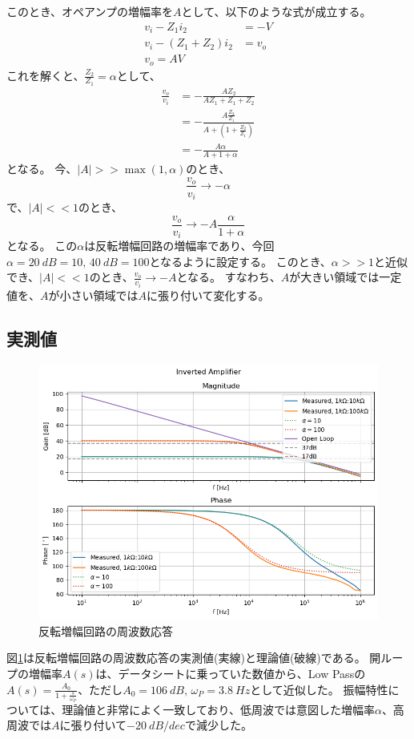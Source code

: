 \documentclass[a4paper]{ltjsarticle}
\begin{document}
このとき、オペアンプの増幅率を$A$として、以下のような式が成立する。
\begin{align}
    v_i - Z_1i_2 &= -V \\
    v_i - (Z_1+Z_2)i_2 &= v_o \\
    v_o = AV
\end{align}
これを解くと、$\frac{Z_2}{Z_1}=\alpha$として、
\begin{align}
    \frac{v_o}{v_i} &= -\frac{AZ_2}{AZ_1+Z_1+Z_2} \nonumber \\
    &= -\frac{A\frac{Z_2}{Z_1}}{A+\left( 1+\frac{Z_2}{Z_1} \right)} \nonumber \\
    &= -\frac{A\alpha}{A+1+\alpha}
\end{align}
となる。
今、$|A| >> \max(1, \alpha)$のとき、
\begin{equation}
    \frac{v_o}{v_i} \rightarrow -\alpha
\end{equation}
で、$|A| << 1$のとき、
\begin{equation}
    \frac{v_o}{v_i} \rightarrow -A\frac{\alpha}{1+\alpha}
\end{equation}
となる。
この$\alpha$は反転増幅回路の増幅率であり、今回$\alpha=\SI{20}{dB}=10,\,\SI{40}{dB}=100$となるように設定する。
このとき、$\alpha >> 1$と近似でき、$|A|<<1$のとき、$\frac{v_o}{v_i}\rightarrow-A$となる。
すなわち、$A$が大きい領域では一定値を、$A$が小さい領域では$A$に張り付いて変化する。

\subsection{実測値}
\begin{figure}[htbp]
    \centering
    \includegraphics[width=0.8\columnwidth]{./images/invertamp_bode.png}
    \caption{反転増幅回路の周波数応答}
    \label{fig:invertamp_bode}
\end{figure}
図\ref{fig:invertamp_bode}は反転増幅回路の周波数応答の実測値(実線)と理論値(破線)である。
開ループの増幅率$A(s)$は、データシートに乗っていた数値から、Low Passの$A(s)=\frac{A_0}{1+\frac{s}{\omega_P}}$、ただし$A_0=\SI{106}{dB},\,\omega_P=\SI{3.8}{Hz}$として近似した。
振幅特性については、理論値と非常によく一致しており、低周波では意図した増幅率$\alpha$、高周波では$A$に張り付いて$\SI{-20}{dB/dec}$で減少した。
\end{document}
